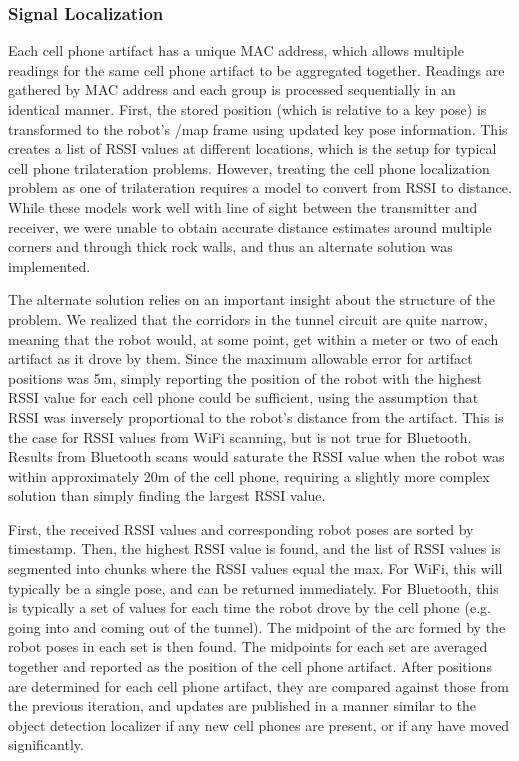 \subsubsection{Signal Localization} 

Each cell phone artifact has a unique MAC address, which allows multiple readings for the same cell phone artifact to be aggregated together. Readings are gathered by MAC address and each group is processed sequentially in an identical manner. First, the stored position (which is relative to a key pose) is transformed to the robot's /map frame using updated key pose information. This creates a list of RSSI values at different locations, which is the setup for typical cell phone trilateration problems. However, treating the cell phone localization problem as one of trilateration requires a model to convert from RSSI to distance. While these models work well with line of sight between the transmitter and receiver, we were unable to obtain accurate distance estimates around multiple corners and through thick rock walls, and thus an alternate solution was implemented.
	
The alternate solution relies on an important insight about the structure of the problem. We realized that the corridors in the tunnel circuit are quite narrow, meaning that the robot would, at some point, get within a meter or two of each artifact as it drove by them. Since the maximum allowable error for artifact positions was 5m, simply reporting the position of the robot with the highest RSSI value for each cell phone could be sufficient, using the assumption that RSSI was inversely proportional to the robot's distance from the artifact. This is the case for RSSI values from WiFi scanning, but is not true for Bluetooth. Results from Bluetooth scans would saturate the RSSI value when the robot was within approximately 20m of the cell phone, requiring a slightly more complex solution than simply finding the largest RSSI value.
	
First, the received RSSI values and corresponding robot poses are sorted by timestamp. Then, the highest RSSI value is found, and the list of RSSI values is segmented into chunks where the RSSI values equal the max. For WiFi, this will typically be a single pose, and can be returned immediately. For Bluetooth, this is typically a set of values for each time the robot drove by the cell phone (e.g. going into and coming out of the tunnel). The midpoint of the arc formed by the robot poses in each set is then found. The midpoints for each set are averaged together and reported as the position of the cell phone artifact. After positions are determined for each cell phone artifact, they are compared against those from the previous iteration, and updates are published in a manner similar to the object detection localizer if any new cell phones are present, or if any have moved significantly.


